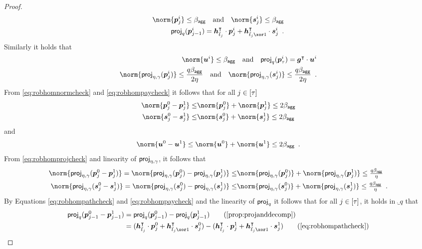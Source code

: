 \begin{proof}
\begin{align}
  \norm{\vec{p}^i_{j}} \leq \bagg\quad\text{and}\quad
  \norm{\vec{s}^i_{j}} \leq \bagg\label{eq:robhomnormcheck}\\
  \projmod{q}(\vec{p}^i_{j-1}) = \vec{h}_{\tilde t_j}^\transpose\cdot \vec{p}^i_{j} + \vec{h}_{\tilde t_j\xor 1}^\transpose \cdot \vec{s}^i_{j}\enspace.\label{eq:robhompathcheck}
  \end{align}
  Similarly it holds that
  \begin{align}
  \norm{\vec{u}^i} \leq \bagg\quad \text{and}\quad \projmod{q}(\vec{p}^i_{\tau}) = \vec{g}^\transpose\cdot \vec{u}^i\label{eq:robhompaycheck}\\
  \norm{\projring(\vec{p}_j^i)}\leq \frac{q\bagg}{2\eta}\quad\text{and}\quad \norm{\projring(\vec{s}_j^i)}\leq \frac{q\bagg}{2\eta}\enspace.\label{eq:robhomprojcheck}
  \end{align}
From \autoref{eq:robhomnormcheck} and \autoref{eq:robhompaycheck} it follows that for all $j \in [\tau]$
  \begin{align*}
    \norm{\vec{p}_j^0-\vec{p}_j^1} \leq& \norm{\vec{p}_j^0} + \norm{\vec{p}_j^1} \leq 2\bagg\\
    \norm{\vec{s}_j^0-\vec{s}_j^1} \leq& \norm{\vec{s}_j^0} + \norm{\vec{s}_j^1} \leq 2\bagg
  \end{align*}
  and
  \[
      \norm{\vec{u}^0-\vec{u}^1} \leq \norm{\vec{u}^0} + \norm{\vec{u}^1} \leq 2\bagg\enspace.
  \]
  From \autoref{eq:robhomprojcheck} and linearity of $\mathsf{proj}_{\eta,\gamma}$, it follows that
\begin{align*}
 \norm{\projring(\vec{p}_j^0 - \vec{p}_j^1)} = \norm{\projring(\vec{p}_j^0)-\projring(\vec{p}_j^1)} \leq& \norm{\projring(\vec{p}_j^0)} + \norm{\projring(\vec{p}_j^1)} \leq \tfrac{q\bagg}{\eta}\\
 \norm{\projring(\vec{s}_j^0 - \vec{s}_j^1)} = \norm{\projring(\vec{s}_j^0)-\projring(\vec{s}_j^1)} \leq& \norm{\projring(\vec{s}_j^0)} + \norm{\projring(\vec{s}_j^1)} \leq \tfrac{q\bagg}{\eta}\enspace.
\end{align*}
%
By Equations \ref{eq:robhompathcheck} and \ref{eq:robhompaycheck} and the linearity of $\mathsf{proj}_{q}$ it follows that for all $j \in [\tau]$, it holds in $\ring_q$ that
  \begin{align*}
    \projmod{q}(\vec{p}^0_{j-1}-\vec{p}^1_{j-1})
    ={} &\projmod{q}(\vec{p}^0_{j-1})-\projmod{q}(\vec{p}^1_{j-1})\tag{\autoref{prop:projanddecomp}}\\
    ={} &(\vec{h}_{\tilde t_j}^\transpose\cdot \vec{p}^0_{j} + \vec{h}_{\tilde t_j\xor 1}^\transpose \cdot \vec{s}^0_{j})- (\vec{h}_{\tilde t_j}^\transpose\cdot \vec{p}^1_{j} + \vec{h}_{\tilde t_j\xor 1}^\transpose \cdot \vec{s}^1_{j})\tag{\autoref{eq:robhompathcheck}}\\

\end{align*}
\end{proof}
